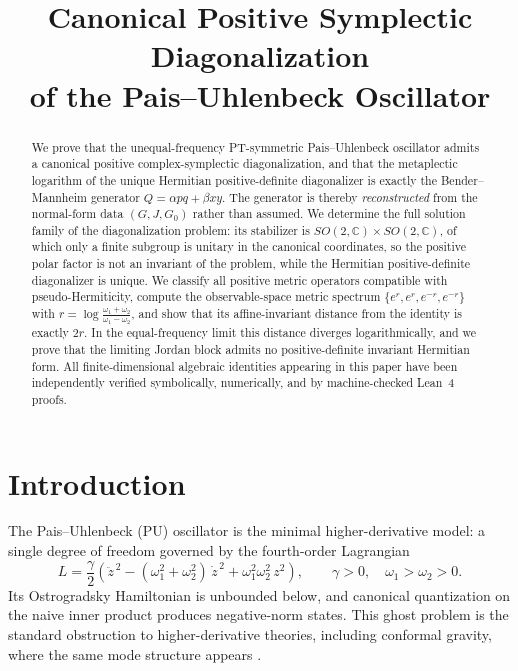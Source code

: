 \documentclass[11pt]{article}
\title{Canonical Positive Symplectic Diagonalization\\ of the Pais--Uhlenbeck Oscillator}
\author{}
\date{}
\theoremstyle{definition}
\theoremstyle{remark}
\newcommand{\C}{\mathbb{C}}
\newcommand{\w}{\omega}
\begin{document}
\maketitle

\begin{abstract}
We prove that the unequal-frequency PT-symmetric Pais--Uhlenbeck oscillator
admits a canonical positive complex-symplectic diagonalization, and that the
metaplectic logarithm of the unique Hermitian positive-definite diagonalizer
is exactly the Bender--Mannheim generator $Q=\alpha pq+\beta xy$.  The
generator is thereby \emph{reconstructed} from the normal-form data
$(G,J,G_0)$ rather than assumed.  We determine the full solution family of the
diagonalization problem: its stabilizer is $SO(2,\C)\times SO(2,\C)$, of which
only a finite subgroup is unitary in the canonical coordinates, so the
positive polar factor is not an invariant of the problem, while the Hermitian
positive-definite diagonalizer is unique.  We classify all positive metric
operators compatible with pseudo-Hermiticity, compute the observable-space
metric spectrum $\{e^{r},e^{r},e^{-r},e^{-r}\}$ with
$r=\log\frac{\w_1+\w_2}{\w_1-\w_2}$, and show that its affine-invariant
distance from the identity is exactly $2r$.  In the equal-frequency limit this
distance diverges logarithmically, and we prove that the limiting Jordan block
admits no positive-definite invariant Hermitian form.  All finite-dimensional
algebraic identities appearing in this paper have been independently verified
symbolically, numerically, and by machine-checked Lean~4 proofs.
\end{abstract}

\section{Introduction}\label{sec:intro}

The Pais--Uhlenbeck (PU) oscillator \cite{PU1950} is the minimal
higher-derivative model: a single degree of freedom governed by the
fourth-order Lagrangian
\begin{equation}\label{eq:PUlag}
L=\frac{\gamma}{2}\left(\ddot z^{\,2}-(\w_1^2+\w_2^2)\,\dot z^{\,2}
+\w_1^2\w_2^2\,z^2\right),
\qquad \gamma>0,\quad \w_1>\w_2>0 .
\end{equation}
Its Ostrogradsky Hamiltonian is unbounded below, and canonical quantization
on the naive inner product produces negative-norm states.  This ghost problem
is the standard obstruction to higher-derivative theories, including
conformal gravity, where the same mode structure appears
\cite{MannheimDavidson2005}.
\end{document}
